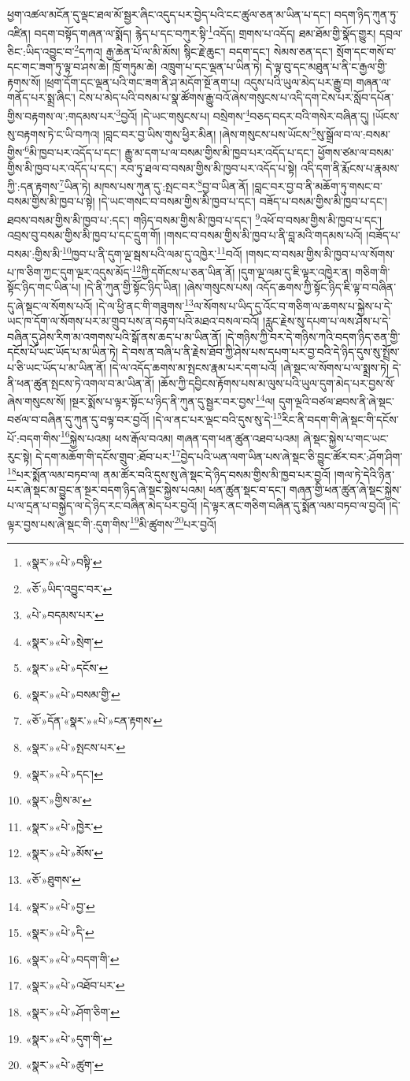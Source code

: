 ཕྱག་འཚལ་མངོན་དུ་ལྡང་ཐལ་མོ་སྦྱར་ཞིང་འདུད་པར་བྱེད་པའི་ངང་ཚུལ་ཅན་མ་ཡིན་པ་དང་། བདག་ཉིད་ཀུན་ཏུ་འཛིན། བདག་བསྟོད་གཞན་ལ་སྨོད། རྙེད་པ་དང་བཀུར་སྟི་\footnote{«སྣར་»«པེ་»བསྟི་}འདོད། གྲགས་པ་འདོད། ཐམ་ཐོམ་གྱི་སྣོད་གྱུར། དབྲལ་ཅིང་:ཡིད་འབྱུང་བ་\footnote{«ཅོ་»ཡིད་འབྱུང་བར་}དཀའ། རྒྱ་ཆེན་པོ་ལ་མི་མོས། སྙིང་རྗེ་ཆུང་། བདག་དང་། སེམས་ཅན་དང་། སྲོག་དང་གསོ་བ་དང་གང་ཟག་ཏུ་ལྟ་བ་ཤས་ཆེ། ཁྲོ་གཏུམ་ཆེ། འཁྲུག་པ་དང་ལྡན་པ་ཡིན་ཏེ། དེ་ལྟ་བུ་དང་མཐུན་པ་ནི་ང་རྒྱལ་གྱི་རྟགས་སོ། །ཕྲག་དོག་དང་ལྡན་པའི་གང་ཟག་ནི་ཤ་མདོག་སྔོ་ནག་པ། འདུས་པའི་ཡུལ་མེད་པར་རྒྱུ་བ། གཞན་ལ་གནོད་པར་སྨྲ་ཞིང་། ངེས་པ་མེད་པའི་བསམ་པ་སྣ་ཚོགས་རྒྱུ་བའོ་ཞེས་གསུངས་པ་འདི་དག་ངེས་པར་སློབ་དཔོན་གྱིས་བརྟགས་ལ་:གདམས་པར་\footnote{«པེ་»བདམས་པར་}བྱའོ། །དེ་ཡང་གསུངས་པ། བསྲེགས་\footnote{«སྣར་»«པེ་»སྲེག་}བཅད་བདར་བའི་གསེར་བཞིན་དུ། །ཡོངས་སུ་བརྟགས་ཏེ་ང་ཡི་བཀའ། །བླང་བར་བྱ་ཡིས་གུས་ཕྱིར་མིན། །ཞེས་གསུངས་པས་ཡོངས་\footnote{«སྣར་»«པེ་»དངོས་}སུ་སྒྲོལ་བ་ལ་:བསམ་གྱིས་\footnote{«སྣར་»«པེ་»བསམ་གྱི་}མི་ཁྱབ་པར་འདོད་པ་དང་། རྒྱུ་མ་དག་པ་ལ་བསམ་གྱིས་མི་ཁྱབ་པར་འདོད་པ་དང་། ཕྱོགས་ཙམ་ལ་བསམ་གྱིས་མི་ཁྱབ་པར་འདོད་པ་དང་། རབ་ཏུ་ཐལ་བ་བསམ་གྱིས་མི་ཁྱབ་པར་འདོད་པ་སྟེ། འདི་དག་ནི་རྨོངས་པ་རྣམས་ཀྱི་:དན་རྟགས་\footnote{«ཅོ་»དོན་«སྣར་»«པེ་»ངན་རྟགས་}ཡིན་ཏེ། མཁས་པས་ཀུན་དུ་:སྤང་བར་\footnote{«སྣར་»«པེ་»སྤངས་པར་}བྱ་བ་ཡིན་ནོ། །བླང་བར་བྱ་བ་ནི་མཆོག་ཏུ་གསང་བ་བསམ་གྱིས་མི་ཁྱབ་པ་སྟེ། །དེ་ཡང་གསང་བ་བསམ་གྱིས་མི་ཁྱབ་པ་དང་། བཟོད་པ་བསམ་གྱིས་མི་ཁྱབ་པ་དང་། ཐབས་བསམ་གྱིས་མི་ཁྱབ་པ་:དང་། གཉིད་བསམ་གྱིས་མི་ཁྱབ་པ་དང་། \footnote{«སྣར་»«པེ་»དང་།  }འཕོ་བ་བསམ་གྱིས་མི་ཁྱབ་པ་དང་། འབྲས་བུ་བསམ་གྱིས་མི་ཁྱབ་པ་དང་དྲུག་གོ། །གསང་བ་བསམ་གྱིས་མི་ཁྱབ་པ་ནི་བླ་མའི་གདམས་པའོ། །བཟོད་པ་བསམ་:གྱིས་མི་\footnote{«སྣར་»གྱིས་མ་}ཁྱབ་པ་ནི་དུག་ལྔ་སྦས་པའི་ལམ་དུ་འཁྱེར་\footnote{«སྣར་»«པེ་»ཁྱེར་}བའོ། །གསང་བ་བསམ་གྱིས་མི་ཁྱབ་པ་ལ་སོགས་པ་ཁ་ཅིག་ཀྱང་དུག་ལྔར་འདུས་མོད་\footnote{«སྣར་»«པེ་»མོས་}ཀྱི་དགོངས་པ་ཅན་ཡིན་ནོ། །དུག་ལྔ་ལམ་དུ་ཇི་ལྟར་འཁྱེར་ན། གཅིག་གི་སྟོང་ཉིད་གང་ཡིན་པ། །དེ་ནི་ཀུན་གྱི་སྟོང་ཉིད་ཡིན། །ཞེས་གསུངས་པས། འདོད་ཆགས་ཀྱི་སྟོང་ཉིད་ཇི་ལྟ་བ་བཞིན་དུ་ཞེ་སྡང་ལ་སོགས་པའོ། །དེ་ལ་ཕྱི་ནང་གི་གཟུགས་\footnote{«ཅོ་»ཐུགས་}ལ་སོགས་པ་ཡིད་དུ་འོང་བ་གཅིག་ལ་ཆགས་པ་སྐྱེས་པ་དེ་ཡང་ཁ་དོག་ལ་སོགས་པར་མ་གྲུབ་པས་ན་བརྟག་པའི་མཐའ་བསལ་བའོ། །རླུང་རྗེས་སུ་དཔག་པ་ལས་ཤེས་པ་དེ་བཞིན་དུ་ཤེས་རིག་མ་འགགས་པའི་སྒོ་ནས་ཆད་པ་མ་ཡིན་ནོ། །དེ་གཉིས་ཀྱི་བར་དེ་གཉིས་ཀའི་བདག་ཉིད་ཅན་གྱི་དངོས་པོ་ཡང་ཡོད་པ་མ་ཡིན་ཏེ། དེ་བས་ན་བཞི་པ་ནི་རྗེས་ཐོབ་ཀྱི་ཤེས་པས་དཔག་པར་བྱ་བའི་དེ་ཉིད་དུས་སུ་སྤྲོས་པ་ཅི་ཡང་ཡོད་པ་མ་ཡིན་ནོ། །དེ་ལ་འདོད་ཆགས་མ་སྤངས་རྣམ་པར་དག་པའོ། །ཞེ་སྡང་ལ་སོགས་པ་ལ་སྨྲས་ཏེ། དེ་ནི་ཕན་ཚུན་སྤངས་ཏེ་འགལ་བ་མ་ཡིན་ནོ། །ཆོས་ཀྱི་དབྱིངས་རྟོགས་པས་མ་ལུས་པའི་ཡུལ་དུག་མེད་པར་བྱས་སོ་ཞེས་གསུངས་སོ། །སྔར་སྨོས་པ་ལྟར་སྟོང་པ་ཉིད་ནི་ཀུན་དུ་སྦྱར་བར་བྱས་\footnote{«སྣར་»«པེ་»བྱ་}ལ། དུག་ལྔའི་བཙལ་ཐབས་ནི་ཞེ་སྡང་བཙལ་བ་བཞིན་དུ་ཀུན་དུ་བལྟ་བར་བྱའོ། །དེ་ལ་ནང་པར་ལྡང་བའི་དུས་སུ་དེ་\footnote{«སྣར་»«པེ་»དི་}རིང་ནི་བདག་གི་ཞེ་སྡང་གི་དངོས་པོ་:བདག་གིས་\footnote{«སྣར་»«པེ་»བདག་གི་}སྐྱེས་པའམ། ཕས་རྒོལ་བའམ། གཞན་དག་ཕན་ཚུན་འཐབ་པའམ། ཞེ་སྡང་སྐྱེས་པ་གང་ཡང་རུང་སྟེ། དེ་དག་མཆོག་གི་དངོས་གྲུབ་:ཐོབ་པར་\footnote{«སྣར་»«པེ་»འཐོབ་པར་}བྱེད་པའི་ཡན་ལག་ཡིན་པས་ཞེ་སྡང་ཅི་བྱུང་ཚོར་བར་:ཤོག་ཤིག་\footnote{«སྣར་»«པེ་»ཤོག་ཅིག་}པར་སྨོན་ལམ་བཏབ་ལ། ནམ་ཚོར་བའི་དུས་སུ་ཞེ་སྡང་དེ་ཉིད་བསམ་གྱིས་མི་ཁྱབ་པར་བྱའོ། །གལ་ཏེ་དེའི་ཉིན་པར་ཞེ་སྡང་མ་བྱུང་ན་སྔར་བདག་ཉིད་ཞེ་སྡང་སྐྱེས་པའམ། ཕན་ཚུན་སྡང་བ་དང་། གཞན་གྱི་ཕན་ཚུན་ཞེ་སྡང་སྐྱེས་པ་ལ་དྲན་པ་བསྐྱེད་ལ་དེ་ཉིད་རང་བཞིན་མེད་པར་བྱའོ། །དེ་ལྟར་ནང་གཅིག་བཞིན་དུ་སྨོན་ལམ་བཏབ་ལ་བྱའོ། །དེ་ལྟར་བྱས་པས་ཞེ་སྡང་གི་:དུག་གིས་\footnote{«སྣར་»«པེ་»དུག་གི་}མི་ཚུགས་\footnote{«སྣར་»«པེ་»ཚུག་}པར་བྱའོ། 